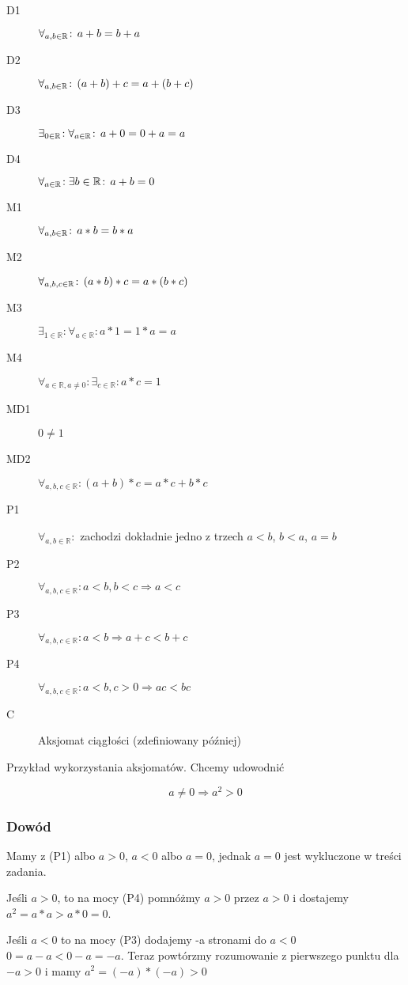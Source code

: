 \documentclass[9pt]{article}
\begin{document}
\begin{description}
    \item[D1] $\forall_{a,b\in \mathbb{R}} \! : \, a+b=b+a$
    \item[D2] $\forall_{a,b\in \mathbb{R}} \! : \, (a+b)+c = a+(b+c)$
    \item[D3] $\exists_{0\in \mathbb{R}} \! :\forall_{a \in \mathbb{R}} \! : \, a+0=0+a=a$
    \item[D4] $\forall_{a\in \mathbb{R}} \! : \exists{b \in \mathbb{R}} \! : \, a+b = 0$
    \item[M1] $\forall_{a,b\in \mathbb{R}} \! : \, a*b=b*a$
    \item[M2] $\forall_{a,b,c\in \mathbb{R}} \! : \, (a*b)*c = a*(b*c)$
    \item[M3] $\exists_{1\in \mathbb{R}} \! : \forall_{a \in \mathbb{R}} \! : a*1=1*a=a$
    \item[M4] $\forall_{a\in \mathbb{R}, a \ne 0} \! : \exists_{c\in \mathbb{R}} \! : a*c=1$
    \item[MD1] $0 \ne 1$
    \item[MD2] $\forall_{a,b,c\in \mathbb{R}} \! : (a+b)*c = a*c + b*c$
    \item[P1] $\forall_{a,b\in \mathbb{R}} \! :$ zachodzi dokładnie jedno z trzech $a<b$, $b<a$, $a=b$
    \item[P2] $\forall_{a,b,c\in \mathbb{R}} \! : a<b, b<c \Rightarrow a<c$
    \item[P3] $\forall_{a,b,c\in \mathbb{R}} \! : a<b \Rightarrow a+c < b+c$
    \item[P4] $\forall_{a,b,c\in \mathbb{R}} \! : a<b, c>0 \Rightarrow ac < bc$
    \item[C] Aksjomat ciągłości (zdefiniowany później)
\end{description}

Przykład wykorzystania aksjomatów. Chcemy udowodnić 

\[
    a\ne 0 \Rightarrow a^2 > 0
\]

\subsubsection*{Dowód}
Mamy z (P1) albo $a>0$, $a<0$ albo $a=0$, jednak $a=0$ jest wykluczone w treści zadania.

Jeśli $a>0$, to na mocy (P4) pomnóżmy $a>0$ przez $a>0$ i dostajemy $a^2=a*a>a*0=0$.

Jeśli $a<0$ to na mocy (P3) dodajemy -a stronami do $a<0$ $0 = a-a < 0-a = -a$. Teraz powtórzmy
rozumowanie z pierwszego punktu dla $-a>0$ i mamy $a^2 = (-a)*(-a) > 0$
\end{document}

